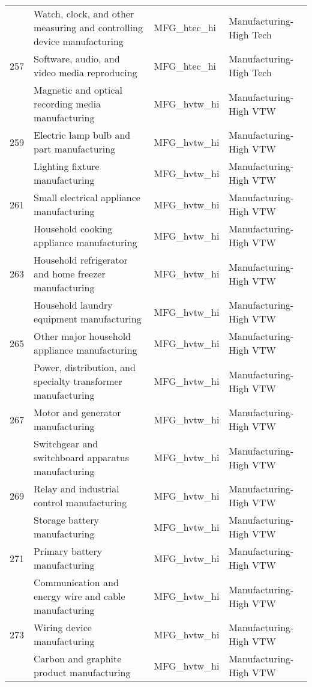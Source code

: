 \begin{landscape}
\begin{small}
\begin{longtable}{clll}
\gray 256 & Watch, clock, and other measuring and controlling device manufacturing & MFG\_htec\_hi & Manufacturing-High Tech \\
257 & Software, audio, and video media reproducing & MFG\_htec\_hi & Manufacturing-High Tech \\
\gray 258 & Magnetic and optical recording media manufacturing & MFG\_hvtw\_hi & Manufacturing-High VTW \\
259 & Electric lamp bulb and part manufacturing & MFG\_hvtw\_hi & Manufacturing-High VTW \\
\gray 260 & Lighting fixture manufacturing & MFG\_hvtw\_hi & Manufacturing-High VTW \\
261 & Small electrical appliance manufacturing & MFG\_hvtw\_hi & Manufacturing-High VTW \\
\gray 262 & Household cooking appliance manufacturing & MFG\_hvtw\_hi & Manufacturing-High VTW \\
263 & Household refrigerator and home freezer manufacturing & MFG\_hvtw\_hi & Manufacturing-High VTW \\
\gray 264 & Household laundry equipment manufacturing & MFG\_hvtw\_hi & Manufacturing-High VTW \\
265 & Other major household appliance manufacturing & MFG\_hvtw\_hi & Manufacturing-High VTW \\
\gray 266 & Power, distribution, and specialty transformer manufacturing & MFG\_hvtw\_hi & Manufacturing-High VTW \\
267 & Motor and generator manufacturing & MFG\_hvtw\_hi & Manufacturing-High VTW \\
\gray 268 & Switchgear and switchboard apparatus manufacturing & MFG\_hvtw\_hi & Manufacturing-High VTW \\
269 & Relay and industrial control manufacturing & MFG\_hvtw\_hi & Manufacturing-High VTW \\
\gray 270 & Storage battery manufacturing & MFG\_hvtw\_hi & Manufacturing-High VTW \\
271 & Primary battery manufacturing & MFG\_hvtw\_hi & Manufacturing-High VTW \\
\gray 272 & Communication and energy wire and cable manufacturing & MFG\_hvtw\_hi & Manufacturing-High VTW \\
273 & Wiring device manufacturing & MFG\_hvtw\_hi & Manufacturing-High VTW \\
\gray 274 & Carbon and graphite product manufacturing & MFG\_hvtw\_hi & Manufacturing-High VTW \\

\end{longtable}
\end{small}
\end{landscape}
